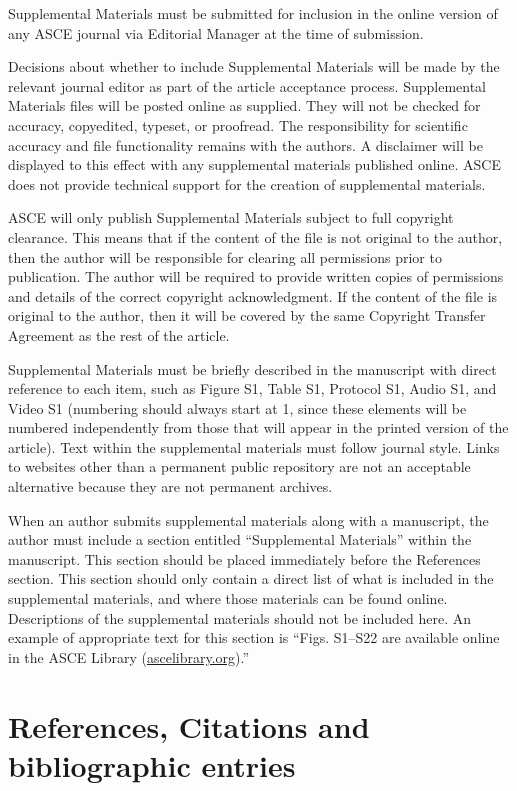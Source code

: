 \documentclass[Journal,letterpaper]{ascelike-new}
\begin{document}
	Supplemental Materials must be submitted for inclusion in the online version of any ASCE journal via Editorial Manager at the time of submission.
	
	Decisions about whether to include Supplemental Materials will be made by the relevant journal editor as part of the article acceptance process. Supplemental Materials files will be posted online as supplied. They will not be checked for accuracy, copyedited, typeset, or proofread. The responsibility for scientific accuracy and file functionality remains with the authors. A disclaimer will be displayed to this effect with any supplemental materials published online. ASCE does not provide technical support for the creation of supplemental materials.
	
	ASCE will only publish Supplemental Materials subject to full copyright clearance. This means that if the content of the file is not original to the author, then the author will be responsible for clearing all permissions prior to publication. The author will be required to provide written copies of permissions and details of the correct copyright acknowledgment. If the content of the file is original to the author, then it will be covered by the same Copyright Transfer Agreement as the rest of the article.
	
	Supplemental Materials must be briefly described in the manuscript with direct reference to each item, such as Figure S1, Table S1, Protocol S1, Audio S1, and Video S1 (numbering should always start at 1, since these elements will be numbered independently from those that will appear in the printed version of the article). Text within the supplemental materials must follow journal style. Links to websites other than a permanent public repository are not an acceptable alternative because they are not permanent archives.
	
	When an author submits supplemental materials along with a manuscript, the author must include a section entitled ``Supplemental Materials'' within the manuscript. This section should be placed immediately before the References section. This section should only contain a direct list of what is included in the supplemental materials, and where those materials can be found online. Descriptions of the supplemental materials should not be included here. An example of appropriate text for this section is ``Figs. S1–S22 are available online in the ASCE Library (\href{http://ascelibrary.org/}{ascelibrary.org}).''
	
	\section{References, Citations and bibliographic entries}
	
\end{document}
